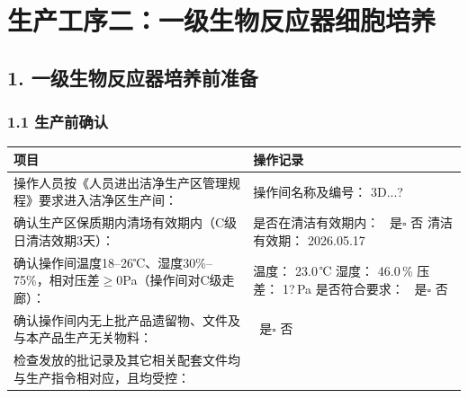 \documentclass[UTF8,10pt,a4paper,fontset=fandol]{ctexart}
\newcommand{\fieldvalue}[1]{#1}
\newcommand{\handwritten}[1]{#1}
\begin{document}
\section*{生产工序二：一级生物反应器细胞培养}

\subsection*{1. 一级生物反应器培养前准备}

\subsubsection*{1.1 生产前确认}

\begin{tabularx}{\textwidth}{|p{}|X|}
\hline
\centering 项目 & \centering 操作记录 \tabularnewline
\hline
操作人员按《人员进出洁净生产区管理规程》要求进入洁净区生产间：
&
操作间名称及编号：
\fieldvalue{\handwritten{3D...?}}
\\
\hline
确认生产区保质期内清场有效期内（C级日清洁效期3天）：
&
是否在清洁有效期内：\newline
\fieldvalue{\checkmark}\ 是\quad $\square$ 否\newline
清洁有效期：
\fieldvalue{\handwritten{2026.05.17}}
\\
\hline
确认操作间温度18--26℃、湿度30\%--75\%，相对压差$\geq$0Pa（操作间对C级走廊）：
&
温度：
\fieldvalue{\handwritten{23.0}}\,℃\quad
湿度：
\fieldvalue{\handwritten{46.0}}\,\%\newline
压差：
\fieldvalue{\handwritten{1?}}\,Pa\newline
是否符合要求：
\fieldvalue{\checkmark}\ 是\quad $\square$ 否
\\
\hline
确认操作间内无上批产品遗留物、文件及与本产品生产无关物料：
&
\fieldvalue{\checkmark}\ 是\quad $\square$ 否
\\
\hline
检查发放的批记录及其它相关配套文件均与生产指令相对应，且均受控：

\end{tabularx}
\end{document}
